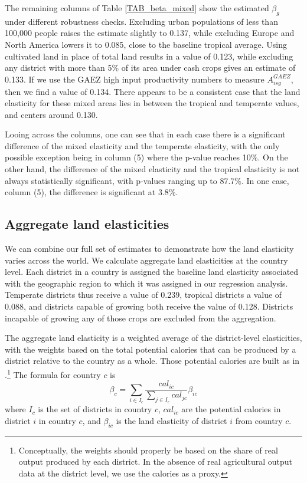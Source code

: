 \documentclass[11pt]{article}
\begin{document}
The remaining columns of Table \ref{TAB_beta_mixed} show the estimated $\beta_g$ under different robustness checks. Excluding urban populations of less than 100,000 people raises the estimate slightly to 0.137, while excluding Europe and North America lowers it to 0.085, close to the baseline tropical average. Using cultivated land in place of total land results in a value of 0.123, while excluding any district with more than 5\% of its area under cash crops gives an estimate of 0.133. If we use the GAEZ high input productivity numbers to measure $A^{GAEZ}_{isg}$, then we find a value of 0.134. There appears to be a consistent case that the land elasticity for these mixed areas lies in between the tropical and temperate values, and centers around 0.130. 

Looing across the columns, one can see that in each case there is a significant difference of the mixed elasticity and the temperate elasticity, with the only possible exception being in column (5) where the p-value reaches 10\%. On the other hand, the difference of the mixed elasticity and the tropical elasticity is not always statistically significant, with p-values ranging up to 87.7\%. In one case, column (5), the difference is significant at 3.8\%. 

\subsection{Aggregate land elasticities}
We can combine our full set of estimates to demonstrate how the land elasticity varies across the world. We calculate aggregate land elasticities at the country level. Each district in a country is assigned the baseline land elasticity associated with the geographic region to which it was assigned in our regression analysis. Temperate districts thus receive a value of 0.239, tropical districts a value of 0.088, and districts capable of growing both receive the value of 0.128. Districts incapable of growing any of those crops are excluded from the aggregation. 

The aggregate land elasticity is a weighted average of the district-level elasticities, with the weights based on the total potential calories that can be produced by a district relative to the country as a whole. Those potential calories are built as in \citet{galorozak2016}.\footnote{Conceptually, the weights should properly be based on the share of real output produced by each district. In the absence of real agricultural output data at the district level, we use the calories as a proxy.} The formula for country $c$ is
\begin{equation}
 	\beta_c = \sum_{i \in I_c} \frac{cal_{ic}}{\sum_{j \in I_c} cal_{jc}} \beta_{ic}
 \end{equation} 
 where $I_c$ is the set of districts in country $c$, $cal_{ic}$ are the potential calories in district $i$ in country $c$, and $\beta_{ic}$ is the land elasticity of district $i$ from country $c$.
\end{document}

